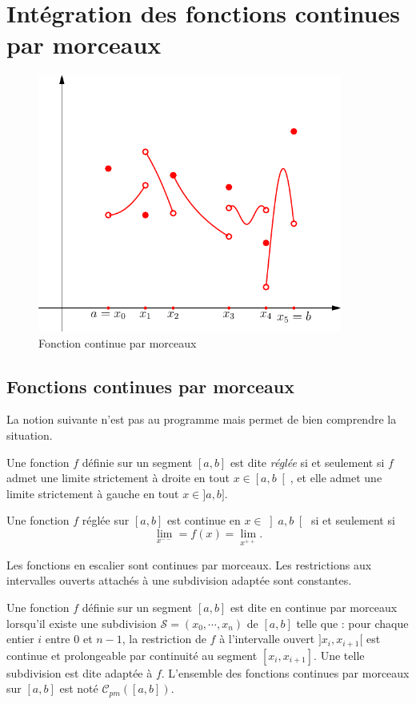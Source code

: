 \section{Intégration des fonctions continues par morceaux}
\begin{figure}[h!t]
 \centering
 \includegraphics[width=10cm]{C2189_2.pdf}
 \caption{Fonction continue par morceaux}
 \label{fig:C2189_2}
\end{figure}

\subsection{Fonctions continues par morceaux}
La notion suivante n'est pas au programme mais permet de bien comprendre la situation.
\begin{defi}
 Une fonction $f$ définie sur un segment $\left[a, b \right]$ est dite \emph{réglée} si et seulement si $f$ admet une limite strictement à droite en tout $x\in \left[ a, b \right[$, et elle admet une limite strictement à gauche en tout $x\in ]a,b]$. 
\end{defi}
Une fonction $f$ réglée sur $\left[a,b\right]$ est continue en $x\in \left]a , b \right[$ si et seulement si
\[
 \lim_{x^{--}} = f(x) = \lim_{x^{++}}.
\]
\begin{exple}
  Les fonctions en escalier sont continues par morceaux. Les restrictions aux intervalles ouverts attachés à une subdivision adaptée sont constantes.
\end{exple}

\begin{defi}
 Une fonction $f$ définie sur un segment $[a,b]$ est dite en continue par morceaux lorsqu'il existe une subdivision $\mathcal S = (x_0,\cdots,x_n)$ de $[a,b]$ telle que : pour chaque entier $i$ entre $0$ et $n-1$, la restriction de $f$ à l'intervalle ouvert $]x_i,x_{i+1}[$ est continue et prolongeable par continuité au segment $[x_i,x_{i+1}]$.\newline
Une telle subdivision est dite adaptée à $f$.\newline
L'ensemble des fonctions continues par morceaux sur $[a,b]$ est noté $\mathcal C_{pm} ([a,b])$.
\end{defi}


